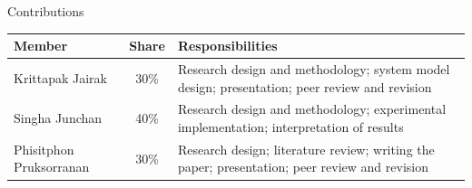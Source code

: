 \documentclass[aspectratio=169,11pt]{beamer}
\begin{document}
\begin{frame}{Contributions}
\vspace{6pt}
\scriptsize
\setlength{\tabcolsep}{8pt}
\renewcommand{\arraystretch}{2}
\centering
\begin{tabular}{p{3.4cm} c p{7.2cm}}
\toprule
\rowcolor{fedacGray}\textbf{Member} & \textbf{Share} & \textbf{Responsibilities}\\
\midrule
Krittapak Jairak       & 30\% & Research design and methodology; system model design; presentation; peer review and revision\\
Singha Junchan         & 40\% & Research design and methodology; experimental implementation; interpretation of results\\
Phisitphon Pruksorranan & 30\% & Research design; literature review; writing the paper; presentation; peer review and revision\\
\bottomrule
\end{tabular}
\vspace{14pt}

\end{frame}
\end{document}
